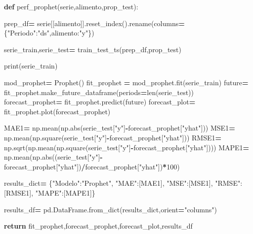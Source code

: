 \documentclass[
]{book}
\newenvironment{Shaded}{\begin{snugshade}}{\end{snugshade}}
\newcommand{\BuiltInTok}[1]{#1}
\newcommand{\ControlFlowTok}[1]{\textcolor[rgb]{0.13,0.29,0.53}{\textbf{#1}}}
\newcommand{\DecValTok}[1]{\textcolor[rgb]{0.00,0.00,0.81}{#1}}
\newcommand{\KeywordTok}[1]{\textcolor[rgb]{0.13,0.29,0.53}{\textbf{#1}}}
\newcommand{\NormalTok}[1]{#1}
\newcommand{\OperatorTok}[1]{\textcolor[rgb]{0.81,0.36,0.00}{\textbf{#1}}}
\newcommand{\StringTok}[1]{\textcolor[rgb]{0.31,0.60,0.02}{#1}}
\begin{document}
\begin{Shaded}
\begin{Highlighting}[]

\KeywordTok{def}\NormalTok{ perf\_prophet(serie,alimento,prop\_test):}

\NormalTok{  prep\_df}\OperatorTok{=}\NormalTok{ serie[[alimento]].reset\_index().rename(columns}\OperatorTok{=}\NormalTok{\{}\StringTok{"Periodo"}\NormalTok{:}\StringTok{"ds"}\NormalTok{,alimento:}\StringTok{"y"}\NormalTok{\})}


\NormalTok{  serie\_train,serie\_test}\OperatorTok{=}\NormalTok{ train\_test\_ts(prep\_df,prop\_test)}

  \BuiltInTok{print}\NormalTok{(serie\_train)}

\NormalTok{  mod\_prophet}\OperatorTok{=}\NormalTok{ Prophet()}
\NormalTok{  fit\_prophet }\OperatorTok{=}\NormalTok{ mod\_prophet.fit(serie\_train)}
\NormalTok{  future}\OperatorTok{=}\NormalTok{ fit\_prophet.make\_future\_dataframe(periods}\OperatorTok{=}\BuiltInTok{len}\NormalTok{(serie\_test))}
\NormalTok{  forecast\_prophet}\OperatorTok{=}\NormalTok{ fit\_prophet.predict(future)}
\NormalTok{  forecast\_plot}\OperatorTok{=}\NormalTok{ fit\_prophet.plot(forecast\_prophet)}

\NormalTok{  MAE1}\OperatorTok{=}\NormalTok{ np.mean(np.}\BuiltInTok{abs}\NormalTok{(serie\_test[}\StringTok{"y"}\NormalTok{]}\OperatorTok{{-}}\NormalTok{forecast\_prophet[}\StringTok{"yhat"}\NormalTok{]))}
\NormalTok{  MSE1}\OperatorTok{=}\NormalTok{ np.mean(np.square(serie\_test[}\StringTok{"y"}\NormalTok{]}\OperatorTok{{-}}\NormalTok{forecast\_prophet[}\StringTok{"yhat"}\NormalTok{]))}
\NormalTok{  RMSE1}\OperatorTok{=}\NormalTok{ np.sqrt(np.mean(np.square(serie\_test[}\StringTok{"y"}\NormalTok{]}\OperatorTok{{-}}\NormalTok{forecast\_prophet[}\StringTok{"yhat"}\NormalTok{])))}
\NormalTok{  MAPE1}\OperatorTok{=}\NormalTok{ np.mean(np.}\BuiltInTok{abs}\NormalTok{((serie\_test[}\StringTok{"y"}\NormalTok{]}\OperatorTok{{-}}\NormalTok{forecast\_prophet[}\StringTok{"yhat"}\NormalTok{])}\OperatorTok{/}\NormalTok{forecast\_prophet[}\StringTok{"yhat"}\NormalTok{])}\OperatorTok{*}\DecValTok{100}\NormalTok{)}

\NormalTok{  results\_dict}\OperatorTok{=}\NormalTok{ \{}\StringTok{"Modelo"}\NormalTok{:}\StringTok{"Prophet"}\NormalTok{,}
                 \StringTok{"MAE"}\NormalTok{:[MAE1],}
                 \StringTok{"MSE"}\NormalTok{:[MSE1],}
                 \StringTok{"RMSE"}\NormalTok{:[RMSE1],}
                 \StringTok{"MAPE"}\NormalTok{:[MAPE1]\}}

\NormalTok{  results\_df}\OperatorTok{=}\NormalTok{ pd.DataFrame.from\_dict(results\_dict,orient}\OperatorTok{=}\StringTok{"columns"}\NormalTok{)}


  \ControlFlowTok{return}\NormalTok{ fit\_prophet,forecast\_prophet,forecast\_plot,results\_df}
  
\end{Highlighting}
\end{Shaded}
\end{document}
